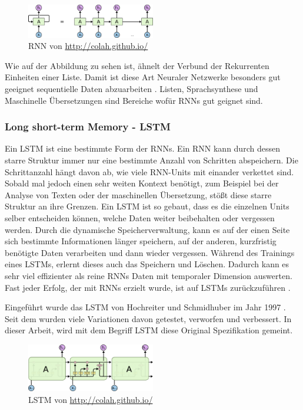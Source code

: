 \documentclass[pdftex,a4paper,halfparskip, article]{scrartcl}
\begin{document}
\begin{figure}[h]
\centering
\includegraphics[width=0.5\textwidth]{colah_rnn}
\caption{RNN von \url{http://colah.github.io/}}
\end{figure}

Wie auf der Abbildung zu sehen ist, ähnelt der Verbund der Rekurrenten Einheiten einer Liste. Damit ist diese Art Neuraler Netzwerke besonders gut geeignet sequentielle Daten abzuarbeiten \cite{colahsBlogLSTM}. Listen, Sprachsynthese und Maschinelle Übersetzungen sind Bereiche wofür RNNs gut geignet sind.



\subsubsection{Long short-term Memory - LSTM}

Ein LSTM ist eine bestimmte Form der RNNs. Ein RNN kann durch dessen starre Struktur immer nur eine bestimmte Anzahl von Schritten abspeichern. Die Schrittanzahl hängt davon ab, wie viele RNN-Units mit einander verkettet sind. Sobald mal jedoch einen sehr weiten Kontext benötigt, zum Beispiel bei der Analyse von Texten oder der maschinellen Übersetzung, stößt diese starre Struktur an ihre Grenzen. Ein LSTM ist so gebaut, dass es die einzelnen Units selber entscheiden können, welche Daten weiter beibehalten oder vergessen werden. Durch die dynamische Speicherverwaltung, kann es auf der einen Seite sich bestimmte Informationen länger speichern, auf der anderen, kurzfristig benötigte Daten verarbeiten und dann wieder vergessen. Während des Trainings eines LSTMs, erlernt dieses auch das Speichern und Löschen. Dadurch kann es sehr viel effizienter als reine RNNs Daten mit temporaler Dimension auswerten. Fast jeder Erfolg, der mit RNNs erzielt wurde, ist auf LSTMs zurückzuführen \cite{colahsBlogLSTM}. 

Eingeführt wurde das LSTM von Hochreiter und Schmidhuber im Jahr 1997 \cite{LSTM_orig}. Seit dem wurden viele Variationen davon getestet, verworfen und verbessert. In dieser Arbeit, wird mit dem Begriff LSTM diese Original Spezifikation gemeint.

\begin{figure}[h]
\centering
\includegraphics[width=0.5\textwidth]{colah_lstm}
\caption{LSTM von \url{http://colah.github.io/}}
\end{figure}
\end{document}

